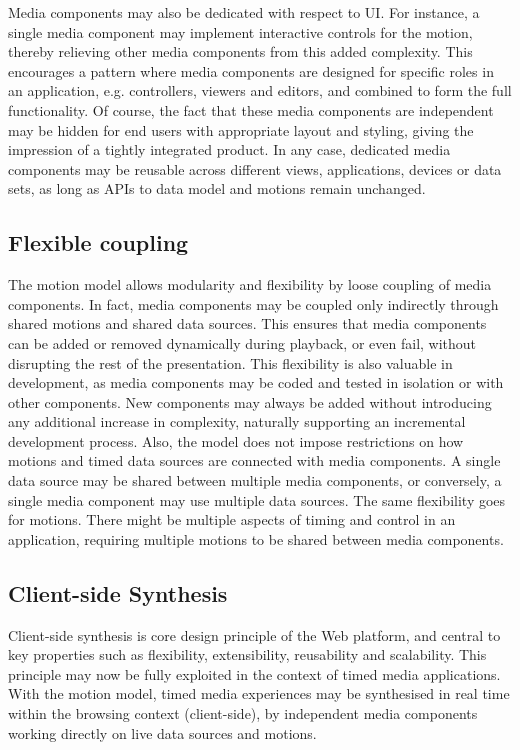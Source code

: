 Media components may also be dedicated with respect to UI. For instance, a
single media component may implement interactive controls for the motion,
thereby relieving other media components from this added complexity. This
encourages a pattern where media components are designed for specific roles in
an application, e.g. controllers, viewers and editors, and combined to form
the full functionality. Of course, the fact that these media components are
independent may be hidden for end users with appropriate layout and styling,
giving the impression of a tightly integrated product. In any case, dedicated
media components may be reusable across different views, applications, devices
or data sets, as long as APIs to data model and motions remain unchanged.

\subsection{Flexible coupling}

The motion model allows modularity and flexibility by loose coupling of media
components. In fact, media components may be coupled only indirectly through
shared motions and shared data sources. This ensures that media components can
be added or removed dynamically during playback, or even fail, without
disrupting the rest of the presentation. This flexibility is also valuable in
development, as media components may be coded and tested in isolation or with
other components. New components may always be added without introducing any
additional increase in complexity, naturally supporting an incremental
development process. Also, the model does not impose restrictions on how
motions and timed data sources are connected with media components. A single
data source may be shared between multiple media components, or conversely, a
single media component may use multiple data sources. The same flexibility
goes for motions. There might be multiple aspects of timing and control in an
application, requiring multiple motions to be shared between media components.


\subsection{Client-side Synthesis}

Client-side synthesis is core design principle of the Web platform, and
central to key properties such as flexibility, extensibility, reusability and
scalability. This principle may now be fully exploited in the context of timed
media applications. With the motion model, timed media experiences
may be synthesised in real time within the browsing context (client-side), by
independent media components working directly on live data sources and
motions.

